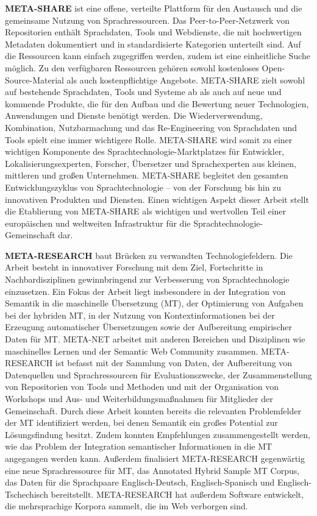 \documentclass[]{../../metanetpaper}
\begin{document}
\begin{multicols}{2}
\textbf{META-SHARE} ist eine offene, verteilte Plattform für den Austausch und die gemeinsame Nutzung von Sprachressourcen. Das Peer-to-Peer-Netzwerk von Repositorien enthält Sprachdaten, Tools und Webdienste, die mit hochwertigen Metadaten dokumentiert und in standardisierte Kategorien unterteilt sind. Auf die Ressourcen kann einfach zugegriffen werden, zudem ist eine einheitliche Suche möglich. Zu den verfügbaren Ressourcen gehören sowohl kostenloses Open-Source-Material als auch kostenpflichtige Angebote. META-SHARE zielt sowohl auf bestehende Sprachdaten, Tools und Systeme ab als auch auf neue und kommende Produkte, die für den Aufbau und die Bewertung neuer Technologien, Anwendungen und Dienste benötigt werden. Die Wiederverwendung, Kombination, Nutzbarmachung und das Re-Engineering von Sprachdaten und Tools spielt eine immer wichtigere Rolle. META-SHARE wird somit zu einer wichtigen Komponente des Sprach\-tech\-no\-lo\-gie-Markt\-platzes für Entwickler, Lokalisierungsexperten, Forscher, Übersetzer und Sprachexperten aus kleinen, mittleren und großen Unternehmen. META-SHARE begleitet den gesamten Entwicklungszyklus von Sprachtechnologie -- von der Forschung bis hin zu innovativen Produkten und Diensten. Einen wichtigen Aspekt dieser Arbeit stellt die Etablierung von META-SHARE als wichtigen und wertvollen Teil einer europäischen und weltweiten Infrastruktur für die Sprachtechnologie-Gemeinschaft dar.

\textbf{META-RESEARCH} baut Brücken zu verwandten Technologiefeldern. Die Arbeit besteht in innovativer Forschung mit dem Ziel, Fortschritte in Nachbardisziplinen gewinnbringend zur Verbesserung von Sprachtechnologie einzusetzen. Ein Fokus der Arbeit liegt insbesondere in der Integration von Semantik in die maschinelle Übersetzung (MT), der Optimierung von Aufgaben bei der hybriden MT, in der Nutzung von Kontextinformationen bei der Erzeugung automatischer Übersetzungen sowie der Aufbereitung empirischer Daten für MT. META-NET arbeitet mit anderen Bereichen und Disziplinen wie maschinelles Lernen und der Semantic Web Community zusammen. META-RESEARCH ist befasst mit der Sammlung von Daten, der Aufbereitung von Datenquellen und Sprachressourcen für Evaluationszwecke, der Zusammenstellung von Repositorien von Tools und Methoden und mit der Organisation von Workshops und Aus- und Weiterbildungsmaßnahmen für Mitglieder der Gemeinschaft. Durch diese Arbeit konnten bereits die relevanten Problemfelder der MT identifiziert werden, bei denen Semantik ein großes Potential zur Lösungsfindung besitzt. Zudem konnten Empfehlungen zusammengestellt werden, wie das Problem der Integration semantischer Informationen in die MT angegangen werden kann. Außerdem finalisiert META-RESEARCH gegenwärtig eine neue Sprachressource für MT, das Annotated Hybrid Sample MT Corpus, das Daten für die Sprachpaare Englisch-Deutsch, Englisch-Spanisch und Englisch-Tschechisch bereitstellt. META-RESEARCH hat außerdem Software entwickelt, die mehrsprachige Korpora sammelt, die im Web verborgen sind.  
\end{multicols}
\end{document}
